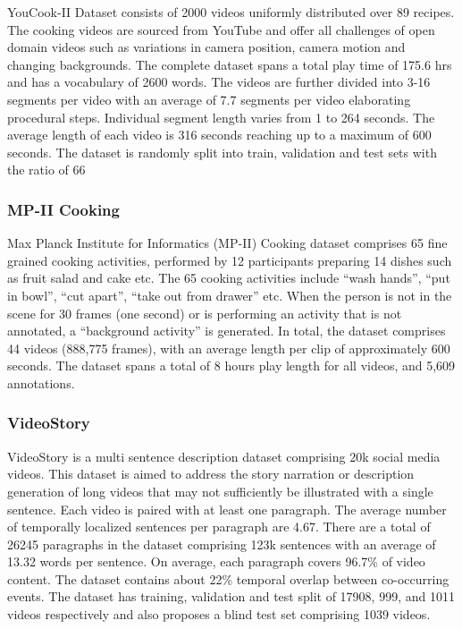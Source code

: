 \par YouCook-II Dataset consists of 2000 videos uniformly distributed over 89 recipes. The cooking videos are sourced from YouTube and offer all challenges of open domain videos such as variations in camera position, camera motion and changing backgrounds. The complete dataset spans a total play time of 175.6 hrs and has a vocabulary of 2600 words. The videos are further divided into 3-16 segments per video with an average of 7.7 segments per video elaborating procedural steps. Individual segment length varies from 1 to 264 seconds. The average length of each video is 316 seconds reaching up to a maximum of 600 seconds. The dataset is randomly split into train, validation and test sets with the ratio of 66%

\subsubsection{MP-II Cooking}

\par Max Planck Institute for Informatics (MP-II) Cooking dataset comprises 65 fine grained cooking activities, performed by 12 participants preparing 14 dishes such as fruit salad and cake etc. The 65 cooking activities include “wash hands”, “put in bowl”, “cut apart”, “take out from drawer” etc. When the person is not in the scene for 30 frames (one second) or is performing an activity that is not annotated, a “background activity” is generated. In total, the dataset comprises 44 videos (888,775 frames), with an average length per clip of approximately 600 seconds. The dataset spans a total of 8 hours play length for all videos, and 5,609 annotations.

\subsubsection{VideoStory}

\par VideoStory is a multi sentence description dataset comprising 20k social media videos. This dataset is aimed to address the story narration or description generation of long videos that may not sufficiently be illustrated with a single sentence. Each video is paired with at least one paragraph. The average number of temporally localized sentences per paragraph are 4.67. There are a total of 26245 paragraphs in the dataset comprising 123k sentences with an average of 13.32 words per sentence. On average, each paragraph covers 96.7\% of video content. The dataset contains about 22\% temporal overlap between co-occurring events. The dataset has training, validation and test split of 17908, 999, and 1011 videos respectively and also proposes a blind test set comprising 1039 videos. 


